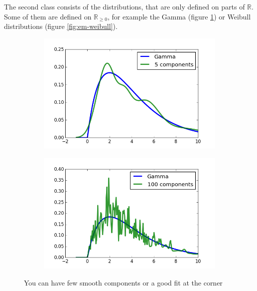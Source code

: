 \documentclass[11pt,a4paper]{book}
\begin{document}
The second class consists of the distributions, that are only defined on parts
of $\mathbb{R}$. Some of them are defined on $\mathbb{R}_{\ge 0}$, for example
the Gamma (figure \ref{fig:em-gamma}) or Weibull distributions (figure
\ref{fig:em-weibull}).
\begin{figure}[h]
  \centering
  \begin{subfigure}{0.45\textwidth}
    \centering
    \includegraphics[width=\textwidth]{thesis/em/gamma-5-components}
  \end{subfigure}
  \hfill
  \begin{subfigure}{0.45\textwidth}
    \centering
    \includegraphics[width=\textwidth]{thesis/em/gamma-100-components}
  \end{subfigure}
  \caption{You can have few smooth components or a good fit at the corner}
  \label{fig:em-gamma}
\end{figure}
\end{document}
